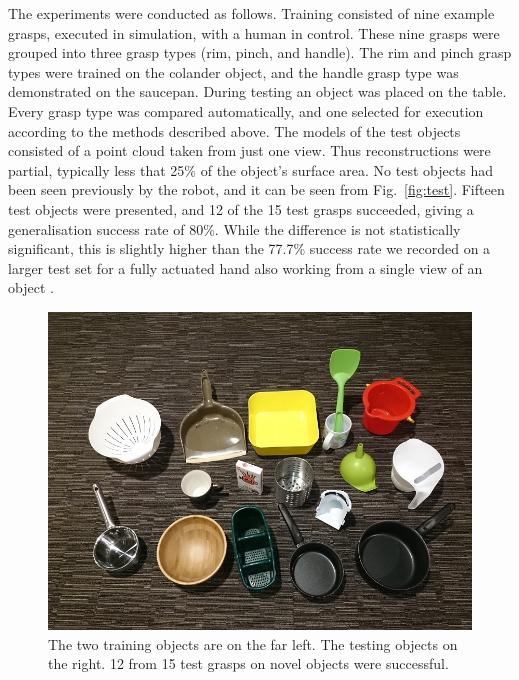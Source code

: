 The experiments were conducted as follows. Training consisted of nine example grasps, executed in simulation, with a human in control. These nine grasps were grouped into three grasp types (rim, pinch, and handle). The rim and pinch grasp types were trained on the colander object, and the handle grasp type was demonstrated on the saucepan. During testing an object was placed on the table. Every grasp type was compared automatically, and one selected for execution according to the methods described above. The models of the test objects consisted of a point cloud taken from just one view. Thus reconstructions were partial, typically less that 25\% of the object's surface area. No test objects had been seen previously by the robot, and it can be seen from Fig.~\ref{fig:test}. Fifteen test objects were presented, and 12 of the 15 test grasps succeeded, giving a generalisation success rate of 80\%. While the difference is not statistically significant, this is slightly higher than the 77.7\% success rate we recorded on a larger test set for a fully actuated hand also working from a single view of an object \cite{kopicki-detry-wyatt-etal-ijrr-2015}.

\begin{figure}
\begin{center}
 \includegraphics[width=0.9\columnwidth]{images/object_set_small}
 \caption{The two training objects are on the far left. The testing objects on the right. 12 from 15 test grasps on novel objects were successful.}
 \label{fig:training}
 \end{center}
\end{figure}

